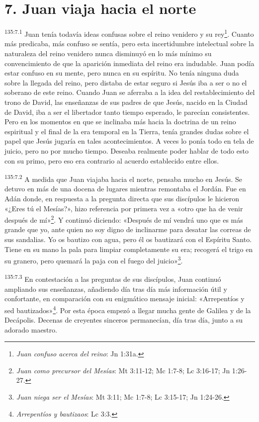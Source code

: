 \section*{7. Juan viaja hacia el norte}
\par
\textsuperscript{135:7.1} Juan tenía todavía ideas confusas sobre el reino venidero y su rey\footnote{\textit{Juan confuso acerca del reino}: Jn 1:31a.}. Cuanto más predicaba, más confuso se sentía, pero esta incertidumbre intelectual sobre la naturaleza del reino venidero nunca disminuyó en lo más mínimo su convencimiento de que la aparición inmediata del reino era indudable. Juan podía estar confuso en su mente, pero nunca en su espíritu. No tenía ninguna duda sobre la llegada del reino, pero distaba de estar seguro si Jesús iba a ser o no el soberano de este reino. Cuando Juan se aferraba a la idea del restablecimiento del trono de David, las enseñanzas de sus padres de que Jesús, nacido en la Ciudad de David, iba a ser el libertador tanto tiempo esperado, le parecían consistentes. Pero en los momentos en que se inclinaba más hacia la doctrina de un reino espiritual y el final de la era temporal en la Tierra, tenía grandes dudas sobre el papel que Jesús jugaría en tales acontecimientos. A veces lo ponía todo en tela de juicio, pero no por mucho tiempo. Deseaba realmente poder hablar de todo esto con su primo, pero eso era contrario al acuerdo establecido entre ellos.

\par
\textsuperscript{135:7.2} A medida que Juan viajaba hacia el norte, pensaba mucho en Jesús. Se detuvo en más de una docena de lugares mientras remontaba el Jordán. Fue en Adán donde, en respuesta a la pregunta directa que sus discípulos le hicieron «¿Eres tú el Mesías?», hizo referencia por primera vez a «otro que ha de venir después de mí»\footnote{\textit{Juan como precursor del Mesías}: Mt 3:11-12; Mc 1:7-8; Lc 3:16-17; Jn 1:26-27.}. Y continuó diciendo: «Después de mí vendrá uno que es más grande que yo, ante quien no soy digno de inclinarme para desatar las correas de sus sandalias. Yo os bautizo con agua, pero él os bautizará con el Espíritu Santo. Tiene en su mano la pala para limpiar completamente su era; recogerá el trigo en su granero, pero quemará la paja con el fuego del juicio»\footnote{\textit{Juan niega ser el Mesías}: Mt 3:11; Mc 1:7-8; Lc 3:15-17; Jn 1:24-26.}.

\par
\textsuperscript{135:7.3} En contestación a las preguntas de sus discípulos, Juan continuó ampliando sus enseñanzas, añadiendo día tras día más información útil y confortante, en comparación con su enigmático mensaje inicial: «Arrepentíos y sed bautizados»\footnote{\textit{Arrepentíos y bautizaos}: Lc 3:3.}. Por esta época empezó a llegar mucha gente de Galilea y de la Decápolis. Decenas de creyentes sinceros permanecían, día tras día, junto a su adorado maestro.

